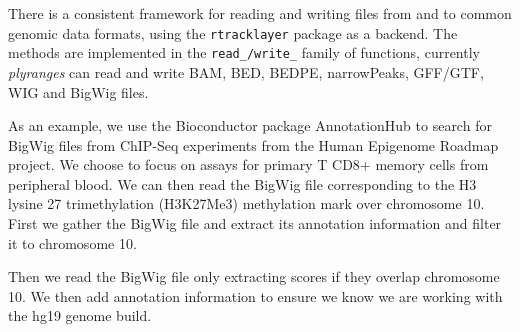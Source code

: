 \documentclass[10pt,letterpaper]{article}
\newenvironment{Shaded}{\begin{snugshade}}{\end{snugshade}}
\newcommand{\CommentTok}[1]{\textcolor[rgb]{0.56,0.35,0.01}{\textit{#1}}}
\newcommand{\DataTypeTok}[1]{\textcolor[rgb]{0.13,0.29,0.53}{#1}}
\newcommand{\KeywordTok}[1]{\textcolor[rgb]{0.13,0.29,0.53}{\textbf{#1}}}
\newcommand{\NormalTok}[1]{#1}
\newcommand{\OperatorTok}[1]{\textcolor[rgb]{0.81,0.36,0.00}{\textbf{#1}}}
\newcommand{\StringTok}[1]{\textcolor[rgb]{0.31,0.60,0.02}{#1}}
\begin{document}
There is a consistent framework for reading and writing files from and
to common genomic data formats, using the \texttt{rtracklayer} package
as a backend. The methods are implemented in the \texttt{read\_/write\_}
family of functions, currently \emph{plyranges} can read and write BAM,
BED, BEDPE, narrowPeaks, GFF/GTF, WIG and BigWig files.

As an example, we use the Bioconductor package AnnotationHub to search
for BigWig files from ChIP-Seq experiments from the Human Epigenome
Roadmap project. We choose to focus on assays for primary T CD8+ memory
cells from peripheral blood. We can then read the BigWig file
corresponding to the H3 lysine 27 trimethylation (H3K27Me3) methylation
mark over chromosome 10. First we gather the BigWig file and extract its
annotation information and filter it to chromosome 10.

\begin{Shaded}
\end{Shaded}

Then we read the BigWig file only extracting scores if they overlap
chromosome 10. We then add annotation information to ensure we know we
are working with the hg19 genome build.

\begin{Shaded}
\end{Shaded}
\end{document}
